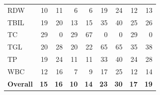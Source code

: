 \begin{table}[ht]
\begin{tabular}{lrrrrrrrr}
RDW & 10 & 11 & 6 & 6 & 19 & 24 & 12 & 13 \\
TBIL & 19 & 20 & 13 & 15 & 35 & 40 & 25 & 26 \\
TC & 29 & 0 & 29 & 67 & 0 & 0 & 29 & 0 \\
TGL & 20 & 28 & 20 & 22 & 65 & 65 & 35 & 38 \\
TP & 19 & 24 & 11 & 11 & 33 & 40 & 24 & 28 \\
WBC & 12 & 16 & 7 & 9 & 17 & 25 & 12 & 14 \\
\midrule
\textbf{Overall} & \textbf{15} & \textbf{16} & \textbf{10} & \textbf{14} & \textbf{23} & \textbf{30} & \textbf{17} & \textbf{19} \\
\bottomrule
\end{tabular}
\label{tab:12_eval_interpretable_eicu}
\end{table}